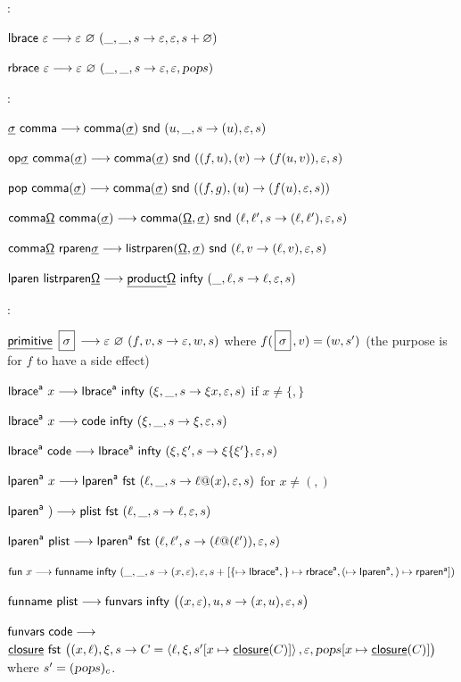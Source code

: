 \documentclass{llncs}
\begin{document}
:
\blist
    \item $\Lbrace\ \epsilon \longto \epsilon\ \varnothing\ (\_,\_,s\to\epsilon,\epsilon,s+\varnothing)$
    \item $\Rbrace\ \epsilon \longto \epsilon\ \varnothing\ (\_,\_,s\to\epsilon,\epsilon,\pop s)$
\elist

:
\blist
    \item $\tsig\ \comma \longto \comma(\tsig)\ \snd\ (u,\_,s\to(u),\epsilon,s)$
    \item $\textsf{op}{\underline{\mathsf{\sigma}}}\ \textsf{comma}({\underline{\mathsf{\sigma}}}) \longrightarrow \textsf{comma}({\underline{\mathsf{\sigma}}})\ \mathsf{snd}\ ((f,u),(v)\to (f(u,v)),\varepsilon,s)$
    \item $\Pop\ \comma(\tsig) \longto \comma(\tsig)\ \snd\ ((f,g),(u)\to (f(u),\epsilon,s))$
    \item $\comma\tOmeg\ \comma(\tsig) \longto \comma(\tOmeg,\tsig)\ \snd\ (\ell,\ell',s\to(\ell,\ell'),\epsilon,s)$
    \item $\textsf{comma}{\underline{\mathsf{\Omega}}}\ \textsf{rparen}{\underline{\mathsf{\sigma}}} \longrightarrow \textsf{listrparen}({\underline{\mathsf{\Omega}}},{\underline{\mathsf{\sigma}}})\ \mathsf{snd}\ (\ell,v\to (\ell,v),\varepsilon,s)$
    \item $\textsf{lparen}\ \textsf{listrparen}{\underline{\mathsf{\Omega}}} \longrightarrow \underline{\mathsf{product}}{\underline{\mathsf{\Omega}}}\ {\sf infty}\ (\_,\ell,s\to \ell,\varepsilon,s)$
\elist

:
\blist
    \item $\primitive\ \isig \longto \epsilon\ \varnothing\ (f,v,s\to \epsilon,w,s)$ where $f(\isig,v)=(w,s')$ (the purpose is for $f$ to have a side effect)
\elist

\blist
    \item $\Lbrace\a\ x\longto \Lbrace\a\ \pinfty\ (\xi,\_,s\to\xi x,\epsilon,s)$ if $x\neq\{,\}$
    \item $\Lbrace\a\ x\longto \code\ \pinfty\ (\xi,\_,s\to\xi,\epsilon,s)$
    \item $\Lbrace\a\ \code\longto \Lbrace\a\ \pinfty\ (\xi,\xi',s\to\xi\{\xi'\},\epsilon,s)$
\elist

\blist
    \item $\lparen\a\ x \longto \lparen\a\ \fst\ (\ell,\_,s\to \ell @(x),\epsilon,s)$ for $x\neq(,)$
    \item $\lparen\a\ ) \longto \plist\ \fst\ (\ell,\_,s\to \ell,\epsilon,s)$
    \item $\lparen\a\ \plist \longto \lparen\a\ \fst\ (\ell,\ell',s\to (\ell @(\ell')),\epsilon,s)$
\elist

\blist
    \item $\fun\ x\longto \funname\ \pinfty\ (\_,\_,s\to(x,\epsilon), \epsilon, s + [\{\mapsto\Lbrace\a,\}\mapsto\Rbrace\a,(\mapsto\lparen\a,)\mapsto\rparen\a])$
    \item $\funname\ \plist \longto \funvars\ \pinfty\ \bigl((x,\epsilon),u,s \to (x,u),\epsilon,s\bigr)$
    \item $\textsf{funvars}\ \textsf{code} \longrightarrow$\hfil\break\null\hfill$\closure\ \fst\ \bigl((x,\ell),\xi,s\to C=\gen{\ell,\xi,s'[x\mapsto\closure(C)]},\epsilon,\pop s[x\mapsto\closure(C)]\bigr)$ where $s'=(\textsl{pop} s)_c$.
\elist
\end{document}
